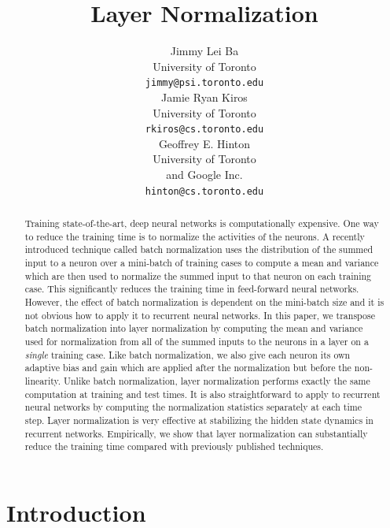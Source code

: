 \documentclass{article}
\title{Layer Normalization}
\author{
Jimmy Lei Ba \\
University of Toronto \\
{\small \texttt{jimmy@psi.toronto.edu}} \\
\And
Jamie Ryan Kiros \\
University of Toronto \\
{\small \texttt{rkiros@cs.toronto.edu}} \\
\And
Geoffrey E. Hinton \\
University of Toronto \\
and Google Inc.\\
{\small \texttt{hinton@cs.toronto.edu} }
}
\begin{document}
\maketitle

\begin{abstract}

  
Training state-of-the-art, deep neural networks is computationally expensive. One way to reduce the training time is to normalize the activities of the neurons.  A recently introduced technique called batch normalization uses the distribution of the summed input to a neuron over a mini-batch of training cases to compute a mean and variance which are then used to normalize the summed input to that neuron on each training case.  This significantly reduces the training time in feed-forward neural networks. However, the effect of batch normalization is dependent on the mini-batch size and it is not obvious how to apply it to recurrent neural networks.  In this paper, we transpose batch normalization into layer normalization by computing the mean and variance used for normalization from all of the summed inputs to the neurons in a layer on a {\it single} training case.  Like batch normalization, we also give each neuron its own adaptive bias and gain which are applied after the normalization but before the non-linearity.  Unlike batch normalization,  layer normalization performs exactly the same computation at training and test times.  It is also straightforward to apply to recurrent neural networks by computing the normalization statistics separately at each time step.  Layer normalization is very effective at stabilizing the hidden state dynamics in recurrent networks. Empirically, we show that layer normalization can substantially reduce the training time compared with previously published techniques.    

\end{abstract}

\section{Introduction}
\label{sec:intro}
\end{document}
